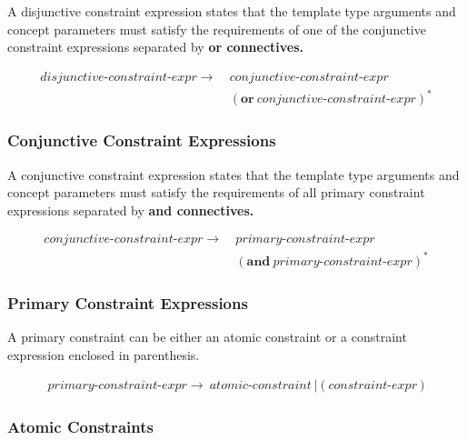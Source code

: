 \documentclass[a4paper,oneside,11pt]{article}
\begin{document}
A disjunctive constraint expression states that the template type arguments and concept parameters must satisfy
the requirements of one of the conjunctive constraint expressions separated by \bf{or} connectives.

\begin{align*}
disjunctive\textrm{-}constraint\textrm{-}expr \rightarrow \> &\hyperref[conjunctiveconstraint]{conjunctive\textrm{-}constraint\textrm{-}expr}\\
&(\textbf{or} \> \hyperref[conjunctiveconstraint]{conjunctive\textrm{-}constraint\textrm{-}expr})^*
\end{align*}

\subsubsection{Conjunctive Constraint Expressions}\label{conjunctiveconstraint}

A conjunctive constraint expression states that the template type arguments and concept parameters must satisfy
the requirements of all primary constraint expressions separated by \bf{and} connectives.

\begin{align*}
conjunctive\textrm{-}constraint\textrm{-}expr \rightarrow \> &\hyperref[primaryconstraint]{primary\textrm{-}constraint\textrm{-}expr}\\
&(\textbf{and} \> \hyperref[primaryconstraint]{primary\textrm{-}constraint\textrm{-}expr})^*
\end{align*}

\subsubsection{Primary Constraint Expressions}\label{primaryconstraint}

A primary constraint can be either an atomic constraint or a constraint expression enclosed in parenthesis.

\begin{align*}
primary\textrm{-}constraint\textrm{-}expr \rightarrow \> \hyperref[atomicconstraint]{atomic\textrm{-}constraint} \> |
\> \texttt{(} \> \hyperref[constraintexpr]{constraint\textrm{-}expr} \> \texttt{)}
\end{align*}

\subsubsection{Atomic Constraints}\label{atomicconstraint}
\end{document}
